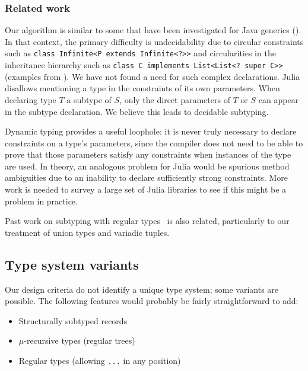 \subsubsection{Related work}

Our algorithm is similar to some that have been investigated for Java
generics (\cite{wehr2008subtyping, Cameron:2009:SWE:1557898.1557902,
Tate:2011:TWJ:1993316.1993570}).
In that context, the primary difficulty is undecidability due to
circular constraints such as \texttt{class Infinite<P extends Infinite<?>>}
and circularities in the inheritance hierarchy such as
\texttt{class C implements List<List<?\ super C>>} (examples from
\cite{Tate:2011:TWJ:1993316.1993570}).
We have not found a need for such complex declarations.
Julia disallows mentioning a type in the constraints of its own parameters.
When declaring type $T$ a subtype of $S$, only the direct parameters of
$T$ or $S$ can appear in the subtype declaration.
We believe this leads to decidable subtyping.

Dynamic typing provides a useful loophole: it is never truly
necessary to declare constraints on a type's parameters, since
the compiler does not need to be able to prove that those
parameters satisfy any constraints when instances of the type are
used.
In theory, an analogous problem for Julia would be spurious method
ambiguities due to an inability to declare sufficiently strong
constraints.
More work is needed to survey a large set of Julia libraries to see
if this might be a problem in practice.

Past work on subtyping with regular
types~\cite{hosoya2000regular, xtatic} is also related, particularly
to our treatment of union types and variadic tuples.

\subsection{Type system variants}

Our design criteria do not identify a unique type system; some
variants are possible.
The following features would probably be fairly straightforward to add:

\vspace{-3ex}
\begin{singlespace}
\begin{itemize}
\item Structurally subtyped records
\item $\mu$-recursive types (regular trees)
\item Regular types (allowing \texttt{...} in any position)
\end{itemize}
\end{singlespace}

